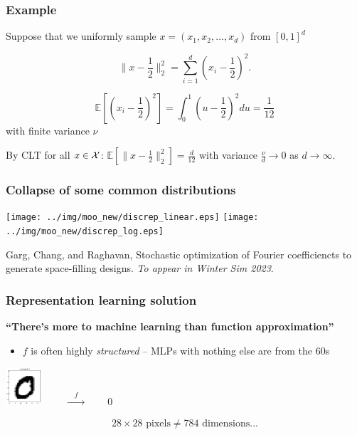 \documentclass[aspectratio=169]{beamer}
\begin{document}
\begin{frame}
\frametitle{Example}

Suppose that we uniformly sample $x = (x_1, x_2, \ldots, x_d)$ from $[0, 1]^d$

\bigskip

$$
\|x - \frac{1}{2}\|_2^2 = \sum_{i=1}^d{(x_i - \frac{1}{2})^2}.
$$

$$
\mathbb{E}\left[ \left(x_i - \frac{1}{2}\right)^2 \right]
= \int_{0}^1 \left(u - \frac{1}{2}\right)^2 du
= \frac{1}{12}
$$
with finite variance $\nu$

\bigskip

By CLT for all $x \in {\cal X}$:
$\mathbb{E}[\|x - \frac{1}{2}\|_2^2] = \frac{d}{12}$
with variance $\frac{\nu}{d}\rightarrow 0$ as $d\rightarrow\infty$.

\end{frame}

\begin{frame}
\frametitle{Collapse of some common distributions}

\begin{center}
\texttt{[image: ../img/moo\_new/discrep\_linear.eps]}
\texttt{[image: ../img/moo\_new/discrep\_log.eps]}
\end{center}

\vfill

{\tiny Garg, Chang, and Raghavan,
Stochastic optimization of Fourier coefficiencts to generate space-filling designs.
{\sl To appear in Winter Sim 2023}.}

\end{frame}

\begin{frame}
\frametitle{Representation learning solution}

\begin{center}
{\large \bf ``There's more to machine learning than function approximation''}
\end{center}

\pause
\bigskip

\begin{itemize}
\item $f$ is often highly {\sl structured} -- MLPs with nothing else are from the 60s
\end{itemize}

\begin{center}
\includegraphics[width=0.1\textwidth]{../img/delaunay_new/mnist_data_0.png}
{\huge $\qquad \xrightarrow{\quad f \quad} \qquad 0$}
\end{center}

\bigskip
$$
28 \times 28 \text{ pixels} \neq 784 \text{ dimensions...}
$$
\end{frame}
\end{document}
